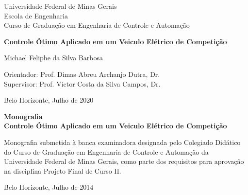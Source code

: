 \begin{titlepage}
	\begin{center}
		{\large Universidade Federal de Minas Gerais\\
			Escola de Engenharia \\
			Curso de Graduação em Engenharia de Controle e Automação\\}

		\vspace{6cm}
		{\bf\Large Controle Ótimo Aplicado em\vspace{0.2cm}
			um Veiculo Elétrico de Competição}
		\vspace{4cm}

		{\large Michael Feliphe da Silva Barbosa}
		\vspace{2cm}

		\vspace{2cm}
		{\large Orientador: Prof. Dimas Abreu Archanjo Dutra, Dr.}\\
		{\large Supervisor: Prof. Víctor Costa da Silva Campos, Dr.}

		\vfill
		{\large Belo Horizonte, Julho de 2020 }
	\end{center}

\end{titlepage}

\newpage
\clearpage
\thispagestyle{empty}


\begin{titlepage}

	\centering
	\textbf{Monografia}\\
	\vspace{2cm}
	\centering
	\textbf{Controle Ótimo Aplicado em um Veiculo Elétrico de Competição}\\
	\vspace{5cm}

	\parbox{1.0\textwidth}
	{\large
		Monografia submetida à banca examinadora
		designada pelo Colegiado Didático do Curso de
		Graduação em Engenharia de Controle e
		Automação da Universidade Federal de Minas
		Gerais, como parte dos requisitos para aprovação na
		disciplina Projeto Final de Curso II.}

	\vspace{7cm}
	\centering
	Belo Horizonte, Julho de 2014

\end{titlepage}
